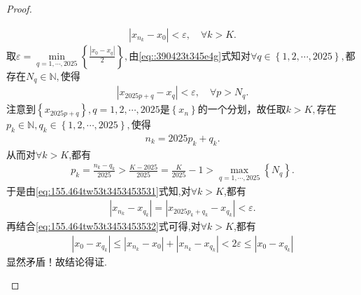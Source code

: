 \documentclass[../../main.tex]{subfiles}%
\begin{document}
\begin{proof}
\begin{enumerate}
\begin{align}
\left| x_{n_k}-x_0 \right|<\varepsilon ,\quad \forall k>K.\label{eq:155.464tw53t3453453532}
\end{align}
取$\varepsilon =\underset{q=1,\cdots ,2025}{\min}\left\{ \frac{\left| x_0-x_q \right|}{2} \right\},$由\eqref{eq::390423t345e4g}式知对$\forall q\in \left\{ 1,2,\cdots ,2025 \right\},$都存在$N_q\in \mathbb{N},$使得
\begin{align}
\left| x_{2025p+q}-x_q \right|<\varepsilon ,\quad \forall p>N_q.\label{eq:155.464tw53t3453453531}
\end{align}
注意到$\left\{ x_{2025p+q} \right\},q=1,2,\cdots ,2025$是$\left\{ x_n \right\}$的一个分划，故任取$k>K,$存在$p_k\in \mathbb{N},q_k\in \left\{ 1,2,\cdots ,2025 \right\},$使得
\begin{align*}
n_k=2025p_k+q_k.
\end{align*}
从而对$\forall k>K$,都有
\begin{align*}
p_k=\frac{n_k-q_k}{2025}>\frac{K-2025}{2025}=\frac{K}{2025}-1>\underset{q=1,\cdots ,2025}{\max}\left\{ N_q \right\}.
\end{align*}
于是由\eqref{eq:155.464tw53t3453453531}式知,对$\forall k>K$,都有
\begin{align*}
\left| x_{n_k}-x_{q_k} \right|=\left| x_{2025p_k+q_k}-x_{q_k} \right|<\varepsilon .
\end{align*}
再结合\eqref{eq:155.464tw53t3453453532}式可得,对$\forall k>K$,都有
\begin{align*}
\left| x_0-x_{q_k} \right|\leqslant \left| x_{n_k}-x_0 \right|+\left| x_{n_k}-x_{q_k} \right|<2\varepsilon \leqslant \left| x_0-x_{q_k} \right|
\end{align*}
显然矛盾！故结论得证.
\end{enumerate}
\end{proof}
\end{document}

